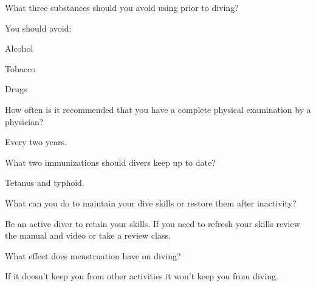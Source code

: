 	\begin{qanda}
		\begin{question}
What three substances should you avoid using prior to diving?
		\end{question}

		\begin{answer}
You should avoid:
			\begin{nospacenumberedlist}
				\item Alcohol
				\item Tobacco
				\item Drugs
			\end{nospacenumberedlist}
		\end{answer}
	\end{qanda}

	\begin{qanda}
		\begin{question}
How often is it recommended that you have a complete physical examination by a physician?
		\end{question}

		\begin{answer}
Every two years.
		\end{answer}
	\end{qanda}

	\begin{qanda}
		\begin{question}
What two immunizations should divers keep up to date?
		\end{question}

		\begin{answer}
Tetanus and typhoid.
		\end{answer}
	\end{qanda}

	\begin{qanda}
		\begin{question}
What can you do to maintain your dive skills or restore them after inactivity?
		\end{question}

		\begin{answer}
Be an active diver to retain your skills.  If you need to refresh your skills review the manual and video or take a review class.
		\end{answer}
	\end{qanda}

	\begin{qanda}
		\begin{question}
What effect does menstruation have on diving?
		\end{question}

		\begin{answer}
If it doesn't keep you from other activities it won't keep you from diving.
		\end{answer}
	\end{qanda}

